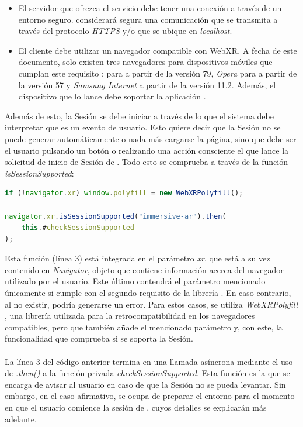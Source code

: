 \documentclass{subfiles}
\begin{document}
        \begin{itemize}
            \item {El servidor que ofrezca el servicio debe tener una conexión a través de un entorno seguro. \webxr considerará segura una comunicación que se transmita a través del protocolo \textit{HTTPS} y/o que se ubique en \textit{localhost}}.
            \item {El cliente debe utilizar un navegador compatible con WebXR. A fecha de este documento, solo existen tres navegadores para dispositivos móviles que cumplan este requisito \cite{web:webxrcompatibility}: \googlechrome para \android a partir de la versión 79, \textit{Opera} para \android a partir de la versión 57 y \textit{Samsung Internet} a partir de la versión 11.2. Además, el dispositivo que lo lance debe soportar la aplicación \arcore.}
        \end{itemize}

        Además de esto, la Sesión se debe iniciar a través de lo que el sistema debe interpretar que es un evento de usuario. Esto quiere decir que la Sesión no se puede generar automáticamente o nada más cargarse la página, sino que debe ser el usuario pulsando un botón o realizando una acción consciente el que lance la solicitud de inicio de Sesión de \ra. Todo esto se comprueba a través de la función \textit{isSessionSupported}:

\begin{lstlisting}[language=JavaScript]
if (!navigator.xr) window.polyfill = new WebXRPolyfill();

navigator.xr.isSessionSupported("immersive-ar").then(
    this.#checkSessionSupported
);
\end{lstlisting}

        Esta función (línea 3) está integrada en el parámetro \textit{xr}, que está a su vez contenido en \textit{Navigator}, objeto que contiene información acerca del navegador utilizado por el usuario. Este último contendrá el parámetro mencionado únicamente si cumple con el segundo requisito de la librería \webxr. En caso contrario, al no existir, podría generarse un error. Para estos casos, se utiliza \textit{WebXRPolyfill} \cite{web:webxrpolyfill}, una librería utilizada para la retrocompatibilidad en los navegadores compatibles, pero que también añade el mencionado parámetro y, con este, la funcionalidad que comprueba si se soporta la Sesión.

        \paragraph{}
        La línea 3 del código anterior termina en una llamada asíncrona mediante el uso de \textit{.then()} a la función privada \textit{checkSessionSupported}. Esta función es la que se encarga de avisar al usuario en caso de que la Sesión no se pueda levantar. Sin embargo, en el caso afirmativo, se ocupa de preparar el entorno para el momento en que el usuario comience la sesión de \ra, cuyos detalles se explicarán más adelante.
\end{document}
